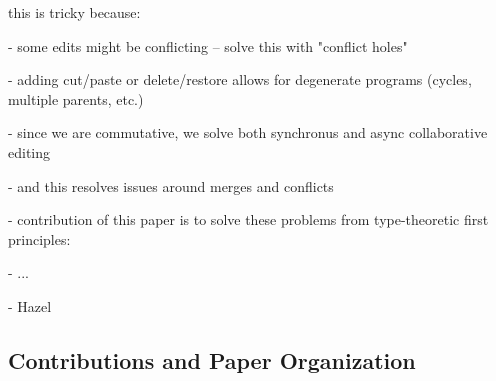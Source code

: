 this is tricky because:

- some edits might be conflicting -- solve this with "conflict holes"

- adding cut/paste or delete/restore allows for degenerate programs (cycles, multiple parents, etc.)

- since we are commutative, we solve both synchronus and async collaborative editing

- and this resolves issues around merges and conflicts

- contribution of this paper is to solve these problems from type-theoretic first principles:

- ...

- Hazel

\subsection{Contributions and Paper Organization}%
\label{sec:Contributions and Paper Organization}
